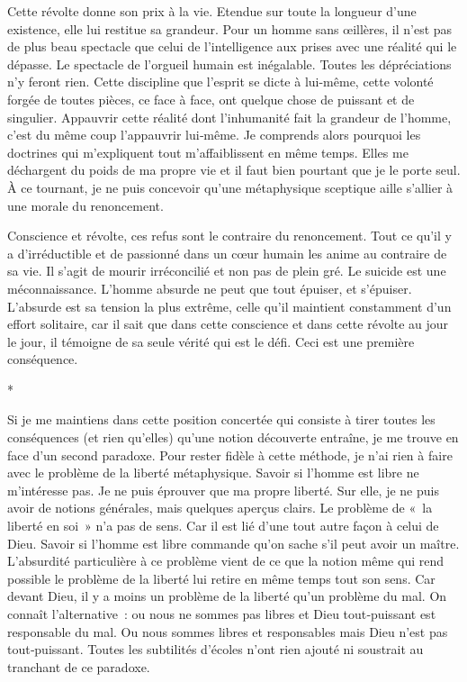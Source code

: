 \documentclass{book}
\begin{document}
Cette révolte donne son prix à la vie. Etendue sur toute la longueur d'une existence, elle lui restitue sa grandeur. Pour un homme sans œillères, il n'est pas de plus beau spectacle que celui de l'intelligence aux prises avec une réalité qui le dépasse. Le spectacle de l'orgueil humain est inégalable. Toutes les dépréciations n'y feront rien. Cette discipline que l'esprit se dicte à lui-même, cette volonté forgée de toutes pièces, ce face à face, ont quelque chose de puissant et de singulier. Appauvrir cette réalité dont l'inhumanité fait la grandeur de l'homme, c'est du même coup l'appauvrir lui‑même. Je comprends alors pourquoi les doctrines qui m'expliquent tout m'affaiblissent en même temps. Elles me déchargent du poids de ma propre vie et il faut bien pourtant que je le porte seul. À ce tournant, je ne puis concevoir qu'une métaphysique sceptique aille s'allier à une morale du renoncement.

Conscience et révolte, ces refus sont le contraire du renoncement. Tout ce qu'il y a d'irréductible et de passionné dans un cœur humain les anime au contraire de sa vie. Il s'agit de mourir irréconcilié et non pas de plein gré. Le suicide est une méconnaissance. L'homme absurde ne peut que tout épuiser, et s'épuiser. L'absurde est sa tension la plus extrême, celle qu'il maintient constamment d'un effort solitaire, car il sait que dans cette conscience et dans cette révolte au jour le jour, il témoigne de sa seule vérité qui est le défi. Ceci est une première conséquence.

\begin{center}
*
\end{center}

Si je me maintiens dans cette position concertée qui consiste à tirer toutes les conséquences (et rien qu'elles) qu'une notion découverte entraîne, je me trouve en face d'un second paradoxe. Pour rester fidèle à cette méthode, je n'ai rien à faire avec le problème de la liberté métaphysique. Savoir si l'homme est libre ne m'intéresse pas. Je ne puis éprouver que ma propre liberté. Sur elle, je ne puis avoir de notions générales, mais quelques aperçus clairs. Le problème de « la liberté en soi » n'a pas de sens. Car il est lié d'une tout autre façon à celui de Dieu. Savoir si l'homme est libre commande qu'on sache s'il peut avoir un maître. L'absurdité particulière à ce problème vient de ce que la notion même qui rend possible le problème de la liberté lui retire en même temps tout son sens. Car devant Dieu, il y a moins un problème de la liberté qu'un problème du mal. On connaît l'alternative : ou nous ne sommes pas libres et Dieu tout‑puissant est responsable du mal. Ou nous sommes libres et responsables mais Dieu n'est pas tout‑puissant. Toutes les subtilités d'écoles n'ont rien ajouté ni soustrait au tranchant de ce paradoxe.
\end{document}
